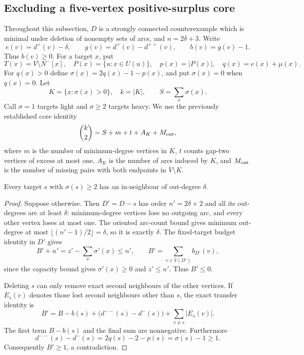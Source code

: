 \subsection{Excluding a five-vertex positive-surplus core}

Throughout this subsection, $D$ is a strongly connected counterexample
which is minimal under deletion of nonempty sets of arcs, and
$n=2\delta+3$. Write
\[
 e(v)=d^+(v)-\delta,\qquad
 g(v)=d^+(v)-d^{++}(v),\qquad b(v)=g(v)-1.
\]
Thus $b(v)\ge0$. For a target $x$, put
\[
 T(x)=V\setminus N^-[x],\quad
 P(x)=\{u:x\in U(u)\},\quad p(x)=|P(x)|,
 \quad q(x)=e(x)+\mu(x).
\]
For $q(x)>0$ define $\sigma(x)=2q(x)-1-p(x)$, and put
$\sigma(x)=0$ when $q(x)=0$. Let
\[
 K=\{x:\sigma(x)>0\},\quad k=|K|,\qquad
 S=\sum_x\sigma(x).
\]
Call $\sigma=1$ targets light and $\sigma\ge2$ targets heavy.
We use the previously established core identity
\begin{equation}\label{eq:core-count-six}
 \binom{k}{2}=S+m+t+A_K+M_{\rm out},
\end{equation}
where $m$ is the number of minimum-degree vertices in $K$,
$t$ counts gap-two vertices of excess at most one,
$A_K$ is the number of arcs induced by $K$, and $M_{\rm out}$
is the number of missing pairs with both endpoints in $V\setminus K$.

\begin{lemma}\label{lem:heavy-minimum-predecessor}
Every target $s$ with $\sigma(s)\ge2$ has an in-neighbour of
out-degree $\delta$.
\end{lemma}
\begin{proof}
Suppose otherwise. Then $D'=D-s$ has order $n'=2\delta+2$
and all its out-degrees are at least $\delta$: minimum-degree vertices
lose no outgoing arc, and every other vertex loses at most one.
The oriented arc-count bound gives minimum out-degree at most
$\lfloor(n'-1)/2\rfloor=\delta$, so it is exactly $\delta$.
The fixed-target
budget identity in $D'$ gives
\[
 B'+n'=z'-\sum_x\sigma'(x)\le n',\qquad
 B'=\sum_{v\in V(D')}b_{D'}(v),
\]
since the capacity bound gives $\sigma'(x)\ge0$ and $z'\le n'$.
Thus $B'\le0$.

Deleting $s$ can only remove exact second neighbours of the other
vertices. If $E_s(v)$ denotes those lost second neighbours other
than $s$, the exact transfer identity is
\[
 B'=B-b(s)+\bigl(d^{--}(s)-d^-(s)\bigr)
       +\sum_{v\ne s}|E_s(v)|.
\]
The first term $B-b(s)$ and the final sum are nonnegative.
Furthermore
\[
 d^{--}(s)-d^-(s)=2q(s)-2-p(s)=\sigma(s)-1\ge1.
\]
Consequently $B'\ge1$, a contradiction.
\end{proof}

